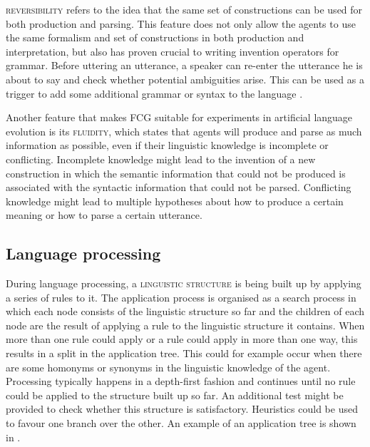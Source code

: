 \textsc{reversibility} refers to the idea that the same set of
constructions can be used for both production and parsing. This
feature does not only allow the agents to use the same formalism and
set of constructions in both production and interpretation, but also
has proven crucial to writing invention operators for grammar. Before
uttering an utterance, a speaker can re-enter the utterance he is
about to say and check whether potential ambiguities arise. This can
be used as a trigger to add some additional grammar or syntax to the
language \citep{steels06how}.

Another feature that makes FCG suitable for experiments in artificial
language evolution is its \textsc{fluidity}, which states that agents
will produce and parse as much information as possible, even if their
linguistic knowledge is incomplete or conflicting. Incomplete
knowledge might lead to the invention of a new construction in which
the semantic information that could not be produced is associated with
the syntactic information that could not be parsed. Conflicting
knowledge might lead to multiple hypotheses about how to produce a
certain meaning or how to parse a certain utterance.

\subsection{Language processing}

During language processing, a \textsc{linguistic
  structure} is being built up by applying
a series of rules to it. The application process is organised as a
search process in which each node consists of the linguistic structure
so far and the children of each node are the result of applying a rule
to the linguistic structure it contains. When more than one rule could
apply or a rule could apply in more than one way, this results in a
split in the application tree. This could for example occur when there
are some homonyms or synonyms in the linguistic knowledge of the
agent. Processing typically happens in a depth-first fashion and
continues until no rule could be applied to the structure built up so
far. An additional test might be provided to check whether this
structure is satisfactory. Heuristics could be used to favour one
branch over the other. An example of an application tree is shown in
.

